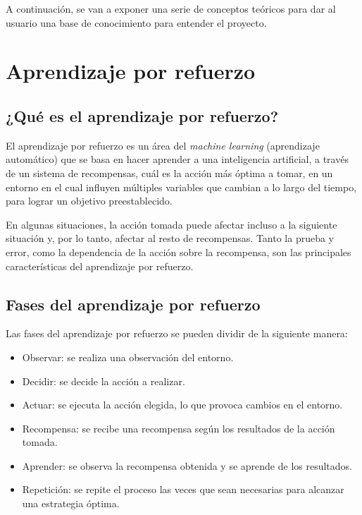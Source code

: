 
A continuación, se van a exponer una serie de conceptos teóricos para dar al usuario una base de conocimiento para entender el proyecto.


\section{Aprendizaje por refuerzo}

\subsection{¿Qué es el aprendizaje por refuerzo?}

El aprendizaje por refuerzo es un área del \textit{machine learning} (aprendizaje automático) que se basa en hacer aprender a una inteligencia artificial, a través de un sistema de recompensas, cuál es la acción más óptima a tomar, en un entorno en el cual influyen múltiples variables que cambian a lo largo del tiempo, para lograr un objetivo preestablecido.

En algunas situaciones, la acción tomada puede afectar incluso a la siguiente situación y, por lo tanto, afectar al resto de recompensas. Tanto la prueba y error, como la dependencia de la acción sobre la recompensa, son las principales características del aprendizaje por refuerzo.

\subsection{Fases del aprendizaje por refuerzo}

Las fases del aprendizaje por refuerzo se pueden dividir de la siguiente manera:

\begin{itemize}
    \item Observar: se realiza una observación del entorno.
    \item Decidir: se decide la acción a realizar.
    \item Actuar: se ejecuta la acción elegida, lo que provoca cambios en el entorno.
    \item Recompensa: se recibe una recompensa según los resultados de la acción tomada.
    \item Aprender: se observa la recompensa obtenida y se aprende de los resultados.
    \item Repetición: se repite el proceso las veces que sean necesarias para alcanzar una estrategia óptima.
\end{itemize}


